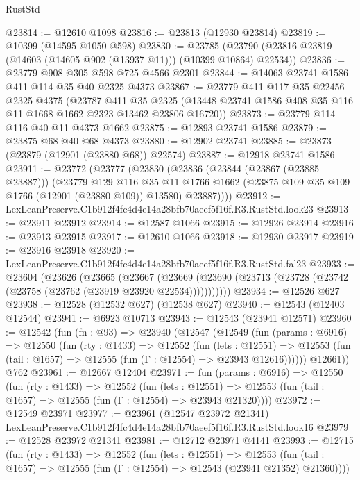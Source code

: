\begin{lexlean}{RustStd}
\begin{coremodule}
@23814 := @12610 @1098
@23816 := @23813 (@12930 @23814)
@23819 := @10399 (@14595 @1050 @598)
@23830 := @23785 (@23790 (@23816 @23819 (@14603 (@14605 @902 (@13937 @11))) (@10399 @10864) @22534))
@23836 := @23779 @908 @305 @598 @725 @4566 @2301
@23844 := @14063 @23741 @1586 @411 @114 @35 @40 @2325 @4373
@23867 := @23779
    @411
    @117
    @35
    @22456
    @2325
    @4375
    (@23787
      @411
      @35
      @2325
      (@13448 @23741 @1586 @408 @35 @116 @11 @1668 @1662 @2323 @13462 @23806 @16720))
@23873 := @23779 @114 @116 @40 @11 @4373 @1662
@23875 := @12893 @23741 @1586
@23879 := @23875 @68 @40 @68 @4373
@23880 := @12902 @23741
@23885 := @23873 (@23879 (@12901 (@23880 @68)) @22574)
@23887 := @12918 @23741 @1586
@23911 := @23772
    (@23777
      (@23830
        (@23836
          (@23844 (@23867 (@23885 @23887)))
          (@23779
            @129
            @116
            @35
            @11
            @1766
            @1662
            (@23875 @109 @35 @109 @1766 (@12901 (@23880 @109)) @13580)
            @23887))))
@23912 := LexLeanPreserve.C1b912f4fc4d4e14a28bfb70aeef5f16f.R3.RustStd.look23
@23913 := @23911 @23912
@23914 := @12587 @1066
@23915 := @12926 @23914
@23916 := @23913 @23915
@23917 := @12610 @1066
@23918 := @12930 @23917
@23919 := @23916 @23918
@23920 := LexLeanPreserve.C1b912f4fc4d4e14a28bfb70aeef5f16f.R3.RustStd.fal23
@23933 := @23604
    (@23626
      (@23665
        (@23667
          (@23669 (@23690 (@23713 (@23728 (@23742 (@23758 (@23762 (@23919 @23920 @22534)))))))))))
@23934 := @12526 @627
@23938 := @12528 (@12532 @627) (@12538 @627)
@23940 := @12543 (@12403 @12544)
@23941 := @6923 @10713
@23943 := @12543 (@23941 @12571)
@23960 := @12542
    (fun (fn : @93) =>
    @23940
      (@12547
        (@12549
          (fun (params : @6916) =>
          @12550
            (fun (rty : @1433) =>
            @12552
              (fun (lets : @12551) =>
              @12553 (fun (tail : @1657) => @12555 (fun (Γ : @12554) => @23943 @12616))))))
        @12661))
    @762
@23961 := @12667 @12404
@23971 := fun (params : @6916) =>
  @12550
    (fun (rty : @1433) =>
    @12552
      (fun (lets : @12551) =>
      @12553 (fun (tail : @1657) => @12555 (fun (Γ : @12554) => @23943 @21320))))
@23972 := @12549 @23971
@23977 := @23961
    (@12547 @23972 @21341)
    LexLeanPreserve.C1b912f4fc4d4e14a28bfb70aeef5f16f.R3.RustStd.look16
@23979 := @12528 @23972 @21341
@23981 := @12712 @23971 @4141
@23993 := @12715
    (fun (rty : @1433) =>
    @12552
      (fun (lets : @12551) =>
      @12553 (fun (tail : @1657) => @12555 (fun (Γ : @12554) => @12543 (@23941 @21352) @21360))))

\end{coremodule}
\end{lexlean}
